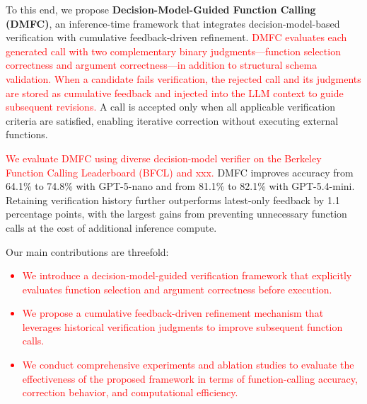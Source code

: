 To this end, we propose \textbf{Decision-Model-Guided Function Calling (DMFC)}, an inference-time framework that integrates decision-model-based verification with cumulative feedback-driven refinement. \textcolor{red}{DMFC evaluates each generated call with two complementary binary judgments---function selection correctness and argument correctness---in addition to structural schema validation. When a candidate fails verification, the rejected call and its judgments are stored as cumulative feedback and injected into the LLM context to guide subsequent revisions.} A call is accepted only when all applicable verification criteria are satisfied, enabling iterative correction without executing external functions.

\textcolor{red}{We evaluate DMFC using diverse decision-model verifier on the Berkeley Function Calling Leaderboard (BFCL) and xxx.} DMFC improves accuracy from 64.1\% to 74.8\% with GPT-5-nano and from 81.1\% to 82.1\% with GPT-5.4-mini. Retaining verification history further outperforms latest-only feedback by 1.1 percentage points, with the largest gains from preventing unnecessary function calls at the cost of additional inference compute.

Our main contributions are threefold:
\textcolor{red}{
\begin{itemize}
    \item We introduce a decision-model-guided verification framework that explicitly evaluates function selection and argument correctness before execution.
    \item We propose a cumulative feedback-driven refinement mechanism that leverages historical verification judgments to improve subsequent function calls.
    \item We conduct comprehensive experiments and ablation studies to evaluate the effectiveness of the proposed framework in terms of function-calling accuracy, correction behavior, and computational efficiency.
\end{itemize}}